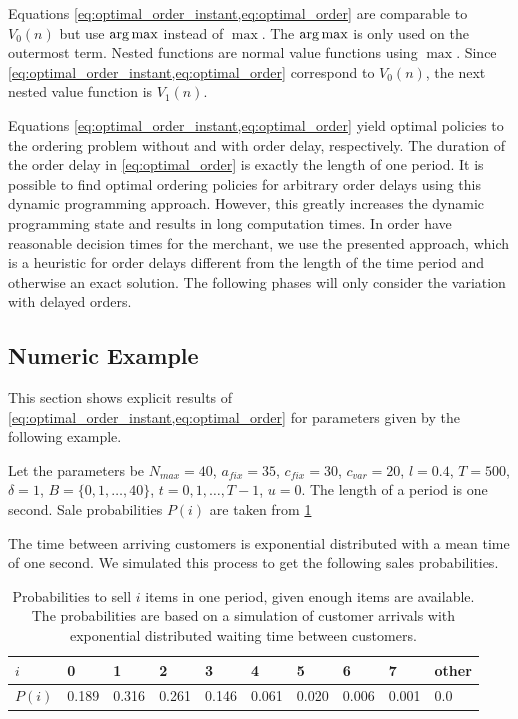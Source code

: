 Equations \cref{eq:optimal_order_instant,eq:optimal_order} are comparable to $V_0(n)$ but use $\operatorname*{arg\,max}$ instead of $\max$. The $\operatorname*{arg\,max}$ is only used on the outermost term.
Nested functions are normal value functions using $\max$.
Since \cref{eq:optimal_order_instant,eq:optimal_order} correspond to $V_0(n)$, the next nested value function is $V_1(n)$.

Equations \cref{eq:optimal_order_instant,eq:optimal_order} yield optimal policies to the ordering problem without and with order delay, respectively.
The duration of the order delay in \cref{eq:optimal_order} is exactly the length of one period.
It is possible to find optimal ordering policies for arbitrary order delays using this dynamic programming approach.
However, this greatly increases the dynamic programming state and results in long computation times.
In order have reasonable decision times for the merchant, we use the presented approach, which is a heuristic for order delays different from the length of the time period and otherwise an exact solution.
The following phases will only consider the variation with delayed orders.

\subsection{Numeric Example}
\label{section:order_example}
This section shows explicit results of \cref{eq:optimal_order_instant,eq:optimal_order} for parameters given by the following example.

\begin{example}
	\label{example:order}
	Let the parameters be $N_{max} = 40$, $a_{fix} = 35$, $c_{fix} = 30$, $c_{var} = 20$,
	$l = 0.4$, $T = 500$, $\delta = 1$, $B = \{0, 1, \ldots, 40\}$, $t = 0, 1, \ldots, T-1$, $u=0$. The length of a period is one second. Sale probabilities $P(i)$ are taken from \cref{tab:sale_probs}
\end{example}

The time between arriving customers is exponential distributed with a mean time of one second.
We simulated this process to get the following sales probabilities.

\begin{table}
\centering
\begin{tabular}{llllllllll}
	\toprule
	$i$ & 0 & 1 & 2 & 3 & 4 & 5 & 6 & 7 & other \\
	\midrule
	$P(i)$ & 0.189 & 0.316 & 0.261 & 0.146 & 0.061 & 0.020 & 0.006 & 0.001 & 0.0\\
	\bottomrule
\end{tabular}
\caption[Sale Probabilities for \cref{example:order}]{Probabilities to sell $i$ items in one period, given enough items are available. The probabilities are based on a simulation of customer arrivals with exponential distributed waiting time between customers.}
\label{tab:sale_probs}
\end{table}

